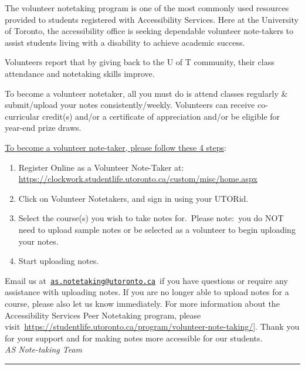 \documentclass[
  openany]{book}
\begin{document}
The volunteer notetaking program is one of the most commonly used resources provided to students registered with Accessibility Services. Here at the University of Toronto, the accessibility office is seeking dependable volunteer note-takers to assist students living with a disability to achieve academic success.

Volunteers report that by giving back to the U of T community, their class attendance and notetaking skills improve.

To become a volunteer notetaker, all you must do is attend classes regularly \& submit/upload your notes consistently/weekly. Volunteers can receive co-curricular credit(s) and/or a certificate of appreciation and/or be eligible for year-end prize draws.

\underline{To become a volunteer note-taker, please follow these 4 steps}:

\begin{enumerate}
\def\labelenumi{\arabic{enumi}.}
\item
  Register Online as a Volunteer Note-Taker at: \url{https://clockwork.studentlife.utoronto.ca/custom/misc/home.aspx}
\item
  Click on Volunteer Notetakers, and sign in using your UTORid.
\item
  Select the course(s) you wish to take notes for.~Please note:~you do NOT need to upload sample notes or be selected as a volunteer to begin uploading your notes.
\item
  Start uploading notes.
\end{enumerate}

Email us at~\href{mailto:as.notetaking@utoronto.ca}{\nolinkurl{as.notetaking@utoronto.ca}}~if you have questions or require any assistance with uploading notes. If you are no longer able to upload notes for a course, please also let us know immediately. For more information about the Accessibility Services Peer Notetaking program, please visit~\href{https://studentlife.utoronto.ca/program/volunteer-note-taking}{https://studentlife.utoronto.ca/program/volunteer-note-taking/}{]}. Thank you for your support and for making notes more accessible for our students.\\

\emph{AS Note-taking Team\\
}

\begin{center}\rule{0.5\linewidth}{0.5pt}\end{center}
\end{document}
